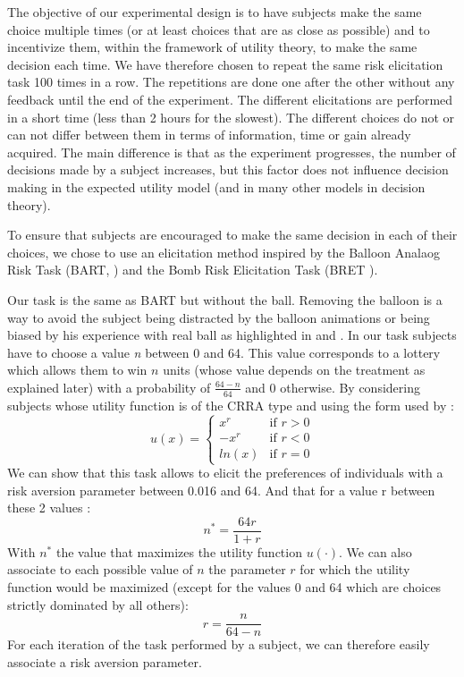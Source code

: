 \documentclass[
]{book}
\begin{document}
The objective of our experimental design is to have subjects make the
same choice multiple times (or at least choices that are as close as
possible) and to incentivize them, within the framework of utility
theory, to make the same decision each time. We have therefore chosen to
repeat the same risk elicitation task 100 times in a row. The
repetitions are done one after the other without any feedback until the
end of the experiment. The different elicitations are performed in a
short time (less than 2 hours for the slowest).
The different choices do
not or can not differ between them in terms of information, time or gain
already acquired. The main difference is that as the experiment
progresses, the number of decisions made by a subject increases, but
this factor does not influence decision making in the expected utility
model (and in many other models in decision theory).

To ensure that subjects are encouraged to make the same decision in each
of their choices, we chose to use an elicitation method inspired by the Balloon
Analaog Risk Task (BART, \citet{lejuez2002evaluation}) and the Bomb Risk Elicitation
Task (BRET \citet{crosetto2013bomb}).

Our task is the same as BART but without the ball.
Removing the balloon is a way to avoid the subject being distracted by the
balloon animations or being biased by his experience with real ball as
highlighted in \citet{steiner2021representative} and \citet{de2020burst}.
In our task subjects have to choose a value \emph{n} between 0 and 64.
This value corresponds to a lottery which allows them to win \(n\) units (whose
value depends on the treatment as explained later) with a probability of
\(\frac{64 - n}{64}\) and 0 otherwise.
By considering subjects whose utility function is of the CRRA
type and using the form used by \citet{wakker2008explaining}:
\[
u(x) = 
\begin{cases} 
  x^r & \text{if } r>0\\
  -x^r & \text{if } r<0\\
  ln(x) & \text{if } r=0
\end{cases}
\]
We can show that this task allows to elicit the preferences of
individuals with a risk aversion parameter between 0.016 and 64. And
that for a value r between these 2 values :
\[
n^* = \frac{64r}{1 + r}
\]
With \(n^*\) the value that maximizes the utility function \(u(\cdot)\). We can
also associate to each possible value of \(n\) the parameter \(r\) for which
the utility function would be maximized (except for the values 0 and 64
which are choices strictly dominated by all others):
\[
r = \frac{n}{64 - n}
\]
For each iteration of the task performed by a subject, we can
therefore easily associate a risk aversion parameter.
\end{document}
